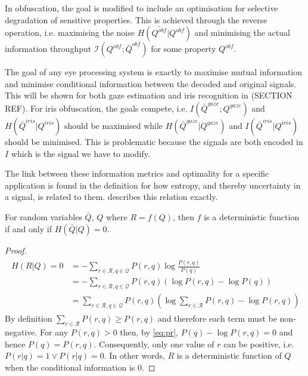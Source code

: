 In obfuscation, the goal is modified to include an optimisation for selective degradation of sensitive properties. This is achieved through the reverse operation, i.e. maximising the noise $H(\bar{Q^{obf}}|Q^{obf})$ and minimising the actual information throughput $\mathcal{I}(Q^{obf};\bar{Q}^{obf})$ for some property $Q^{obf}$. 

The goal of any eye processing system is exactly to maximise mutual information and minimise conditional information between the decoded and original signals. This will be shown for both gaze estimation and iris recognition in (SECTION REF). For iris obfuscation, the goals compete, i.e. $I(\bar{Q}^{gaze};Q^{gaze})$ and $H(\bar{Q}^{iris}|Q^{iris})$ should be maximised while $H(\bar{Q}^{gaze}|Q^{gaze})$ and $I(\bar{Q}^{iris}|Q^{iris})$ should be minimised. This is problematic because the signals are both encoded in $I$ which is the signal we have to modify. 

The link between these information metrics and optimality for a specific application is found in the definition for how entropy, and thereby uncertainty in a signal, is related to them.  describes this relation exactly. 

\begin{theorem}
    For random variables $\bar{Q}$, $Q$ where $R=f(Q)$, then $f$ is a deterministic function if and only if $H(\bar{Q}|Q)=0$.
\end{theorem}

\begin{proof}

\begin{align}\label{eq:pr}
\begin{aligned}
    H(R|Q) = 0 &=-\sum_{r\in\mathcal{R}, q\in\mathcal{Q}} P(r,q)\log\frac{P(r,q)}{P(q)}\\
    &= -\sum_{r\in\mathcal{R}, q\in\mathcal{Q}} P(r,q)\left(\log P(r,q) - \log P(q)\right)\\
    &= \sum_{r\in\mathcal{R}, q\in\mathcal{Q}} P(r, q)\left(\log \sum_{r\in\mathcal{R}} P(r, q) - \log P(r,q)\right)
\end{aligned}
\end{align}
By definition $\sum_{r\in\mathcal{R}} P(r, q) \geq P(r,q)$ and therefore each term must be non-negative. For any $P(r,q) > 0$ then, by \cref{eq:pr}, $P(q) - \log P(r,q) = 0$ and hence $P(q) = P(r,q)$. Consequently, only one value of $r$ can be positive, i.e. $P(r|q) = 1 \vee P(r|q) = 0$. In other words, $R$ is a deterministic function of $Q$ when the conditional information is $0$. 
\end{proof}

